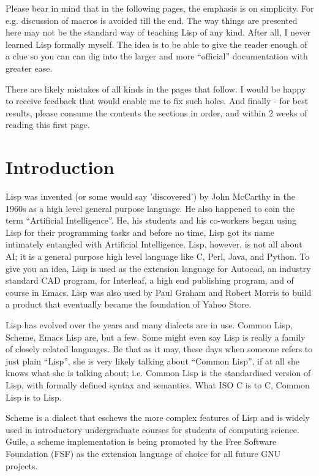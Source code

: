\documentclass[10pt]{article}
\begin{document}
Please bear in mind that in the following pages, the emphasis is on simplicity.
For e.g. discussion of macros is avoided till the end. The way things are
presented here may not be the standard way of teaching Lisp of any kind.  After
all, I never learned Lisp formally myself.  The idea is to be able to give the
reader enough of a clue so you can can dig into the larger and more
``official'' documentation with greater ease.

There are likely mistakes of all kinds in the pages that follow.  I would be
happy to receive feedback that would enable me to fix such holes.  And finally
- for best results, please consume the contents the sections in order, and
within 2 weeks of reading this first page.

\section{Introduction}

Lisp was invented (or some would say 'discovered') by John McCarthy in the
1960s as a high level general purpose language.  He also happened to coin the
term ``Artificial Intelligence''.  He, his students and his co-workers began
using Lisp for their programming tasks and before no time, Lisp got its name
intimately entangled with Artificial Intelligence.  Lisp, however, is not all
about AI; it is a general purpose high level language like C, Perl, Java, and
Python.  To give you an idea, Lisp is used as the extension language for
Autocad, an industry standard CAD program, for Interleaf, a high end publishing
program, and of course in Emacs.  Lisp was also used by Paul Graham and Robert
Morris to build a product that eventually became the foundation of Yahoo Store.

Lisp has evolved over the years and many dialects are in use.  Common Lisp,
Scheme, Emacs Lisp are, but a few.  Some might even say Lisp is really a family
of closely related languages.  Be that as it may, these days when someone
refers to just plain ``Lisp'', she is very likely talking about ``Common
Lisp'', if at all she knows what she is talking about; i.e.  Common Lisp is the
standardised version of Lisp, with formally defined syntax and semantics.  What
ISO C is to C, Common Lisp is to Lisp.

Scheme is a dialect that eschews the more complex features of Lisp and is
widely used in introductory undergraduate courses for students of computing
science.  Guile, a scheme implementation is being promoted by the Free Software
Foundation (FSF) as the extension language of choice for all future GNU
projects.
\end{document}
